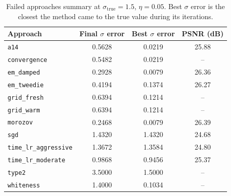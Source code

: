 \begin{table}[h]
\centering
\small
\begin{tabular}{lccc}
\toprule
Approach & Final $\sigma$ error & Best $\sigma$ error & PSNR (dB) \\
\midrule
\texttt{a14} & 0.5628 & 0.0219 & 25.88 \\
\texttt{convergence} & 0.5482 & 0.0219 & -- \\
\texttt{em_damped} & 0.2928 & 0.0079 & 26.36 \\
\texttt{em_tweedie} & 0.4194 & 0.1374 & 26.27 \\
\texttt{grid_fresh} & 0.6394 & 0.1214 & -- \\
\texttt{grid_warm} & 0.6394 & 0.1214 & -- \\
\texttt{morozov} & 0.2468 & 0.0079 & 26.39 \\
\texttt{sgd} & 1.4320 & 1.4320 & 24.68 \\
\texttt{time_lr_aggressive} & 1.3672 & 1.3584 & 24.80 \\
\texttt{time_lr_moderate} & 0.9868 & 0.9456 & 25.37 \\
\texttt{type2} & 3.5000 & 1.5000 & -- \\
\texttt{whiteness} & 1.4000 & 0.1034 & -- \\
\bottomrule
\end{tabular}
\caption{Failed approaches summary at $\sigma_{\text{true}}=1.5$, $\eta=0.05$. Best $\sigma$ error is the closest the method came to the true value during its iterations.}
\label{tab:failed_approaches}
\end{table}
